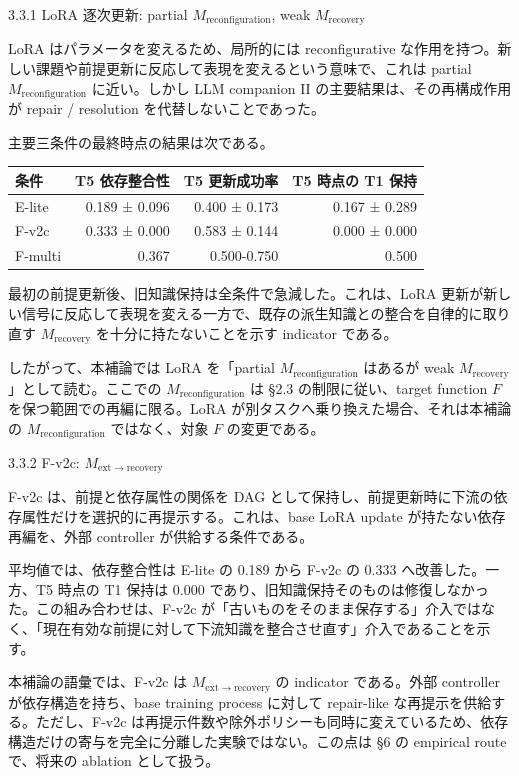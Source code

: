 \documentclass[12pt,a4paper]{article}
\begin{document}
3.3.1 LoRA 逐次更新: partial \(M_{\mathrm{reconfiguration}}\), weak \(M_{\mathrm{recovery}}\)

LoRA はパラメータを変えるため、局所的には reconfigurative な作用を持つ。新しい課題や前提更新に反応して表現を変えるという意味で、これは partial \(M_{\mathrm{reconfiguration}}\) に近い。しかし LLM companion II の主要結果は、その再構成作用が repair / resolution を代替しないことであった。

主要三条件の最終時点の結果は次である。

{\def\LTcaptype{table} %
\begin{longtable}[]{@{}lrrr@{}}
\toprule\noalign{}
条件 & T5 依存整合性 & T5 更新成功率 & T5 時点の T1 保持 \\
\midrule\noalign{}
\endhead
\bottomrule\noalign{}
\endlastfoot
E-lite & 0.189 ± 0.096 & 0.400 ± 0.173 & 0.167 ± 0.289 \\
F-v2c & 0.333 ± 0.000 & 0.583 ± 0.144 & 0.000 ± 0.000 \\
F-multi & 0.367 & 0.500-0.750 & 0.500 \\
\end{longtable}
}

最初の前提更新後、旧知識保持は全条件で急減した。これは、LoRA 更新が新しい信号に反応して表現を変える一方で、既存の派生知識との整合を自律的に取り直す \(M_{\mathrm{recovery}}\) を十分に持たないことを示す indicator である。

したがって、本補論では LoRA を「partial \(M_{\mathrm{reconfiguration}}\) はあるが weak \(M_{\mathrm{recovery}}\)」として読む。ここでの \(M_{\mathrm{reconfiguration}}\) は §2.3 の制限に従い、target function \(F\) を保つ範囲での再編に限る。LoRA が別タスクへ乗り換えた場合、それは本補論の \(M_{\mathrm{reconfiguration}}\) ではなく、対象 \(F\) の変更である。

3.3.2 F-v2c: \(M_{\mathrm{ext}\to\mathrm{recovery}}\)

F-v2c は、前提と依存属性の関係を DAG として保持し、前提更新時に下流の依存属性だけを選択的に再提示する。これは、base LoRA update が持たない依存再編を、外部 controller が供給する条件である。

平均値では、依存整合性は E-lite の 0.189 から F-v2c の 0.333 へ改善した。一方、T5 時点の T1 保持は 0.000 であり、旧知識保持そのものは修復しなかった。この組み合わせは、F-v2c が「古いものをそのまま保存する」介入ではなく、「現在有効な前提に対して下流知識を整合させ直す」介入であることを示す。

本補論の語彙では、F-v2c は \(M_{\mathrm{ext}\to\mathrm{recovery}}\) の indicator である。外部 controller が依存構造を持ち、base training process に対して repair-like な再提示を供給する。ただし、F-v2c は再提示件数や除外ポリシーも同時に変えているため、依存構造だけの寄与を完全に分離した実験ではない。この点は §6 の empirical route で、将来の ablation として扱う。
\end{document}
